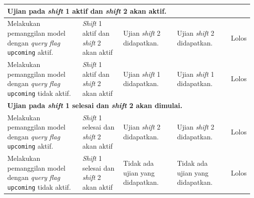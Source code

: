 \begin{enumerate}
\begin{longtable}{|p{}|p{}|p{}|p{}|p{}|}
            \multicolumn{5}{|p{0.8\textwidth}|}{\textbf{Ujian pada \textit{shift} 1 aktif dan \textit{shift} 2 akan aktif.}}\\
            \hline
            Melakukan pemanggilan model dengan \textit{query} \textit{flag} \texttt{upcoming} aktif. &
            \textit{Shift} 1 aktif dan \textit{shift} 2 akan aktif & Ujian \textit{shift} 2 didapatkan. & Ujian \textit{shift} 2 didapatkan. & Lolos \\
            \hline
            Melakukan pemanggilan model dengan \textit{query} \textit{flag} \texttt{upcoming} tidak aktif. &
            \textit{Shift} 1 aktif dan \textit{shift} 2 akan aktif & Ujian \textit{shift} 1 didapatkan. & Ujian \textit{shift} 1 didapatkan. & Lolos \\
            \hline
            
            \multicolumn{5}{|p{0.8\textwidth}|}{\textbf{Ujian pada \textit{shift} 1 selesai dan \textit{shift} 2 akan dimulai.}}\\
            \hline
            Melakukan pemanggilan model dengan \textit{query} \textit{flag} \texttt{upcoming} aktif. &
            \textit{Shift} 1 selesai dan \textit{shift} 2 akan aktif & Ujian \textit{shift} 2 didapatkan. & Ujian \textit{shift} 2 didapatkan. & Lolos \\
            \hline
            Melakukan pemanggilan model dengan \textit{query} \textit{flag} \texttt{upcoming} tidak aktif. &
            \textit{Shift} 1 selesai dan \textit{shift} 2 akan aktif & Tidak ada ujian yang didapatkan. & Tidak ada ujian yang didapatkan. & Lolos \\
            \hline
            

\end{longtable}
\end{enumerate}
